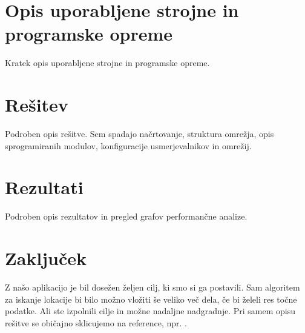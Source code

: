 \documentclass[11pt,a4paper,slovene]{article}
\begin{document}
\section{Opis uporabljene strojne in programske opreme}
Kratek opis uporabljene strojne in programske opreme.

\section{Rešitev}
Podroben opis rešitve. Sem spadajo načrtovanje, struktura omrežja, opis sprogramiranih modulov, konfiguracije usmerjevalnikov in omrežij.

\section{Rezultati}
Podroben opis rezultatov in pregled grafov performančne analize.

\section{Zaključek}
Z našo aplikacijo je bil dosežen željen cilj, ki smo si ga postavili. Sam algoritem za iskanje lokacije bi bilo možno vložiti še veliko več dela, če bi želeli res točne podatke.
Ali ste izpolnili cilje in možne nadaljne nadgradnje. Pri samem opisu rešitve se običajno sklicujemo na reference, npr. \cite{cisco}. 

\pagebreak


\end{document}
